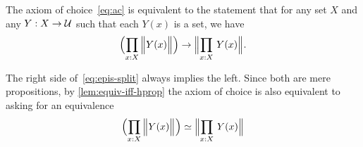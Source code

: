 \documentclass[hott-all.tex]{subfiles}
\begin{document}
\begin{lem}\label{thm:ac-epis-split}
  The axiom of choice~\eqref{eq:ac} is equivalent to the statement that for any set $X$ and any $Y:X\to\mathcal{U}$ such that each $Y(x)$ is a set, we have
  \begin{equation}
    \Parens{\prd{x:X} \Brck{Y(x)}}
    \to
    \Brck{\prd{x:X} Y(x)}.\label{eq:epis-split}
  \end{equation}
\end{lem}
%
%
%
%
\begin{rmk}
  The right side of~\eqref{eq:epis-split} always implies the left.
  Since both are mere propositions, by \cref{lem:equiv-iff-hprop} the axiom of choice is also equivalent to asking for an equivalence
  \[ \eqv{\Parens{\prd{x:X} \Brck{Y(x)}}}{\Brck{\prd{x:X} Y(x)}} \]
\end{rmk}
%
\end{document}
